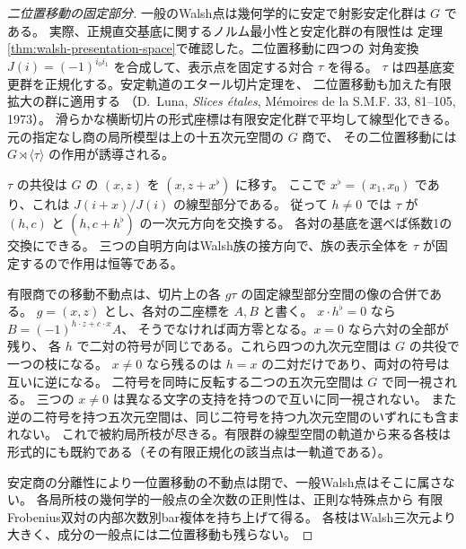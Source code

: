 \begin{proof}[二位置移動の固定部分]
一般のWalsh点は幾何学的に安定で射影安定化群は $G$ である。
実際、正規直交基底に関するノルム最小性と安定化群の有限性は
定理\ref{thm:walsh-presentation-space}で確認した。二位置移動に四つの
対角変換 $J(i)=(-1)^{i_0 i_1}$ を合成して、表示点を固定する対合 $\tau$ を得る。
$\tau$ は四基底変更群を正規化する。安定軌道のエタール切片定理を、
二位置移動も加えた有限拡大の群に適用する
（D.~Luna, \emph{Slices étales}, Mémoires de la S.M.F. 33, 81--105, 1973）。
滑らかな横断切片の形式座標は有限安定化群で平均して線型化できる。
元の指定なし商の局所模型は上の十五次元空間の $G$ 商で、
その二位置移動には $G\rtimes\langle\tau\rangle$ の作用が誘導される。

$\tau$ の共役は $G$ の $(x,z)$ を $(x,z+x^\flat)$ に移す。
ここで $x^\flat=(x_1,x_0)$ であり、これは $J(i+x)/J(i)$ の線型部分である。
従って $h\ne0$ では $\tau$ が $(h,c)$ と $(h,c+h^\flat)$ の一次元方向を交換する。
各対の基底を選べば係数1の交換にできる。
三つの自明方向はWalsh族の接方向で、族の表示全体を $\tau$ が固定するので作用は恒等である。

有限商での移動不動点は、切片上の各 $g\tau$ の固定線型部分空間の像の合併である。
$g=(x,z)$ とし、各対の二座標を $A,B$ と書く。
$x\cdot h^\flat=0$ なら $B=(-1)^{h\cdot z+c\cdot x}A$、
そうでなければ両方零となる。$x=0$ なら六対の全部が残り、
各 $h$ で二対の符号が同じである。これら四つの九次元空間は $G$ の共役で一つの枝になる。
$x\ne0$ なら残るのは $h=x$ の二対だけであり、両対の符号は互いに逆になる。
二符号を同時に反転する二つの五次元空間は $G$ で同一視される。
三つの $x\ne0$ は異なる文字の支持を持つので互いに同一視されない。
また逆の二符号を持つ五次元空間は、同じ二符号を持つ九次元空間のいずれにも含まれない。
これで被約局所枝が尽きる。有限群の線型空間の軌道から来る各枝は
形式的にも既約である（その有限正規化の該当点は一軌道である）。

安定商の分離性により一位置移動の不動点は閉で、一般Walsh点はそこに属さない。
各局所枝の幾何学的一般点の全次数の正則性は、正則な特殊点から
有限Frobenius双対の内部次数別bar複体を持ち上げて得る。
各枝はWalsh三次元より大きく、成分の一般点には二位置移動も残らない。
\end{proof}
